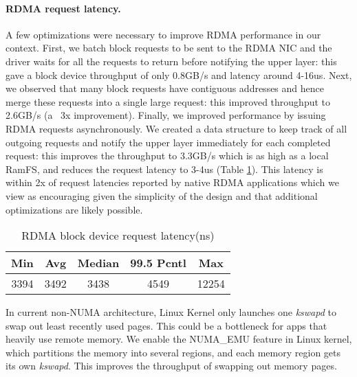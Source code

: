 \paragraph{RDMA request latency.} A few optimizations were necessary to improve RDMA performance in our context. First, we batch block requests to be sent to the RDMA NIC and the driver waits for all the requests to return before notifying the upper layer: this gave a block device throughput of only 0.8GB/s and latency around 4-16us.
Next, we observed that many block requests have contiguous addresses and hence merge these requests into a single large request: this improved throughput to 2.6GB/s (a ~3x improvement).
Finally, we improved performance by issuing RDMA requests asynchronously. We created a data structure to keep track of all outgoing requests and notify the upper layer immediately for each completed request: this improves the throughput to 3.3GB/s which is as high as a local RamFS, and reduces the request latency to 3-4us (Table \ref{tab:rdma_latency}). 
This latency is within 2x of request latencies reported by native RDMA applications which we view as encouraging given the simplicity of the design and that additional optimizations are likely possible.

\begin{table}[t]
    \centering
    \small
    \begin{tabular}{ccccc}
    \textbf{Min}	& \textbf{Avg}	& \textbf{Median} & \textbf{99.5 Pcntl}	& \textbf{Max}\\
    \hline
    3394 &	3492&	3438&	4549&	12254\\\hline
    \end{tabular}
    \caption{RDMA block device request latency(ns)}
    \label{tab:rdma_latency}
\end{table}

In current non-NUMA architecture, Linux Kernel only launches one \textit{kswapd} to swap out least recently used pages. 
This could be a bottleneck for apps that heavily use remote memory.
We enable the NUMA\_EMU feature in Linux kernel, which partitions the memory into several regions, and each memory region gets its own \textit{kswapd}. 
This improves the throughput of swapping out memory pages.


